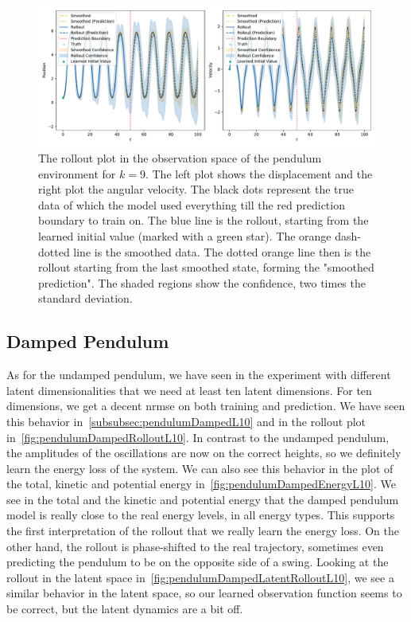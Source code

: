 		\begin{figure}
			\centering
			\includegraphics[width=\linewidth]{figures/results/pendulum/run-latent-dim-09/rollout-observations-N0.pdf}
			\caption{The rollout plot in the observation space of the pendulum environment for \(k = 9\). The left plot shows the displacement and the right plot the angular velocity. The black dots represent the true data of which the model used everything till the red prediction boundary to train on. The blue line is the rollout, starting from the learned initial value (marked with a green star). The orange dash-dotted line is the smoothed data. The dotted orange line then is the rollout starting from the last smoothed state, forming the "smoothed prediction". The shaded regions show the confidence, \ie two times the standard deviation.}
			\label{fig:pendulumRolloutL09}
		\end{figure}

	\subsection{Damped Pendulum}
		As for the undamped pendulum, we have seen in the experiment with different latent dimensionalities that we need at least ten latent dimensions. For ten dimensions, we get a decent \ac{nrmse} on both training and prediction. We have seen this behavior in~\autoref{subsubsec:pendulumDampedL10} and in the rollout plot in~\autoref{fig:pendulumDampedRolloutL10}. In contrast to the undamped pendulum, the amplitudes of the oscillations are now on the correct heights, so we definitely learn the energy loss of the system. We can also see this behavior in the plot of the total, kinetic and potential energy in~\autoref{fig:pendulumDampedEnergyL10}. We see in the total and the kinetic and potential energy that the damped pendulum model is really close to the real energy levels, in all energy types. This supports the first interpretation of the rollout that we really learn the energy loss. On the other hand, the rollout is phase-shifted to the real trajectory, sometimes even predicting the pendulum to be on the opposite side of a swing. Looking at the rollout in the latent space in~\autoref{fig:pendulumDampedLatentRolloutL10}, we see a similar behavior in the latent space, so our learned observation function seems to be correct, but the latent dynamics are a bit off.


